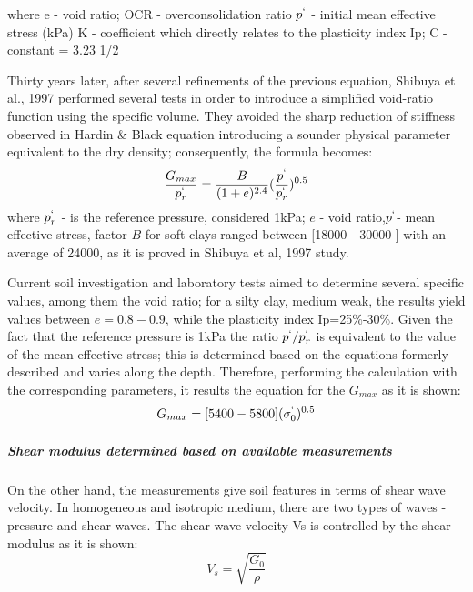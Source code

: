\documentclass[12pt,a4paper]{report}
\begin{document}
where e - void ratio;
OCR - overconsolidation ratio
$p^`$ - initial mean effective stress (kPa)
K - coefficient which directly relates to the plasticity index Ip;
C - constant = 3.23 1/2 

Thirty years later, after several refinements of the previous equation, Shibuya et al., 1997 \cite{shibuya1997elastic} performed several tests in order to introduce a simplified void-ratio function using the specific volume. They avoided the sharp reduction of stiffness observed in Hardin \& Black equation introducing a sounder physical parameter equivalent to the dry density; consequently, the formula becomes:
\begin{equation}
\frac{G_{max}}{p^`_r}=\frac{B}{(1+e)^{2.4}}(\frac{p^`}{p^`_r})^{0.5}
\end{equation}
where $p^`_r$ - is the reference pressure, considered 1kPa; $e$ - void ratio,$p^`$- mean effective stress, factor $B$ for soft clays ranged between [18000 - 30000 ] with an average of 24000, as it is proved in Shibuya et al, 1997 study.

Current soil investigation and laboratory tests aimed to determine several specific values, among them the void ratio; for a silty clay, medium weak, the results yield values between $e=0.8-0.9$, while the plasticity index Ip=25\%-30\%. Given the fact that the reference pressure is 1kPa the ratio $p^`/p^`_r$ is equivalent to the value of the mean effective stress; this is determined based on the equations formerly described and varies along the depth. Therefore, performing the calculation with the corresponding parameters, it results the equation for the $G_{max}$ as it is shown:
\begin{equation}
	G_{max}=[5400-5800](\sigma^`_0)^{0.5}
\end{equation}

\subparagraph{Shear modulus determined based on available measurements }
On the other hand, the measurements give soil features in terms of shear wave velocity. In homogeneous and isotropic medium, there are two types of waves - pressure and shear waves. The shear wave velocity Vs is controlled by the shear modulus as it is shown:
\begin{equation}
	V_s=\sqrt{\frac{G_0}{\rho}}
\end{equation}
\end{document}
